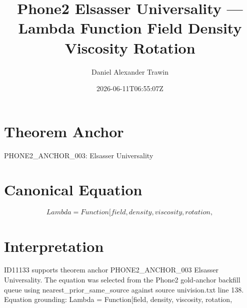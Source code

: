 \documentclass[11pt]{article}
\title{Phone2 Elsasser Universality — Lambda Function Field Density Viscosity Rotation}
\author{Daniel Alexander Trawin}
\date{2026-06-11T06:55:07Z}
\begin{document}
\maketitle
\section*{Theorem Anchor}
PHONE2_ANCHOR_003: Elsasser Universality
\section*{Canonical Equation}
\[
Lambda = Function[{field, density, viscosity, rotation},
\]
\section*{Interpretation}
ID11133 supports theorem anchor PHONE2_ANCHOR_003 Elsasser Universality. The equation was selected from the Phone2 gold-anchor backfill queue using nearest_prior_same_source against source univision.txt line 138. Equation grounding: Lambda = Function[{field, density, viscosity, rotation},
\end{document}
